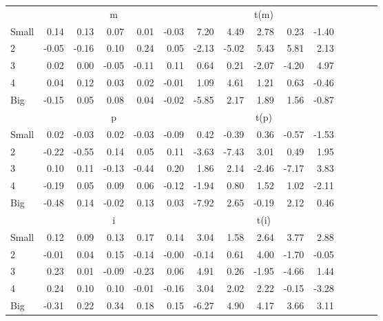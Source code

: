 \begin{table}[!ht]
\begin{tabular}{lrrrrrrrrrrrrrr}
      & \multicolumn{5}{c}{m} & \multicolumn{5}{c}{t(m)}
    
    \\
      \cmidrule(r){2-6} \cmidrule(r){7-11}

    Small   & 0.14  & 0.13  & 0.07  & 0.01  & -0.03  & 7.20  & 4.49  & 2.78  & 0.23  & -1.40  \\
         2  & -0.05  & -0.16  & 0.10  & 0.24  & 0.05  & -2.13  & -5.02  & 5.43  & 5.81  & 2.13  \\
         3  & 0.02  & 0.00  & -0.05  & -0.11  & 0.11  & 0.64  & 0.21  & -2.07  & -4.20  & 4.97  \\
         4  & 0.04  & 0.12  & 0.03  & 0.02  & -0.01  & 1.09  & 4.61  & 1.21  & 0.63  & -0.46  \\
    Big     & -0.15  & 0.05  & 0.08  & 0.04  & -0.02  & -5.85  & 2.17  & 1.89  & 1.56  & -0.87  \\

  
    
      & \multicolumn{5}{c}{p} & \multicolumn{5}{c}{t(p)}
    
    \\
      \cmidrule(r){2-6} \cmidrule(r){7-11}

    Small   & 0.02  & -0.03  & 0.02  & -0.03  & -0.09  & 0.42  & -0.39  & 0.36  & -0.57  & -1.53  \\
         2  & -0.22  & -0.55  & 0.14  & 0.05  & 0.11  & -3.63  & -7.43  & 3.01  & 0.49  & 1.95  \\
         3  & 0.10  & 0.11  & -0.13  & -0.44  & 0.20  & 1.86  & 2.14  & -2.46  & -7.17  & 3.83  \\
         4  & -0.19  & 0.05  & 0.09  & 0.06  & -0.12  & -1.94  & 0.80  & 1.52  & 1.02  & -2.11  \\
    Big     & -0.48  & 0.14  & -0.02  & 0.13  & 0.03  & -7.92  & 2.65  & -0.19  & 2.12  & 0.46  \\

  
    
      & \multicolumn{5}{c}{i} & \multicolumn{5}{c}{t(i)}
    
    \\
      \cmidrule(r){2-6} \cmidrule(r){7-11}

    Small   & 0.12  & 0.09  & 0.13  & 0.17  & 0.14  & 3.04  & 1.58  & 2.64  & 3.77  & 2.88  \\
         2  & -0.01  & 0.04  & 0.15  & -0.14  & -0.00  & -0.14  & 0.61  & 4.00  & -1.70  & -0.05  \\
         3  & 0.23  & 0.01  & -0.09  & -0.23  & 0.06  & 4.91  & 0.26  & -1.95  & -4.66  & 1.44  \\
         4  & 0.24  & 0.10  & 0.10  & -0.01  & -0.16  & 3.04  & 2.02  & 2.22  & -0.15  & -3.28  \\
    Big     & -0.31  & 0.22  & 0.34  & 0.18  & 0.15  & -6.27  & 4.90  & 4.17  & 3.66  & 3.11  \\

  

  \bottomrule
\end{tabular}
\label{tbl:25_Size_NI_B16b}
\end{table}